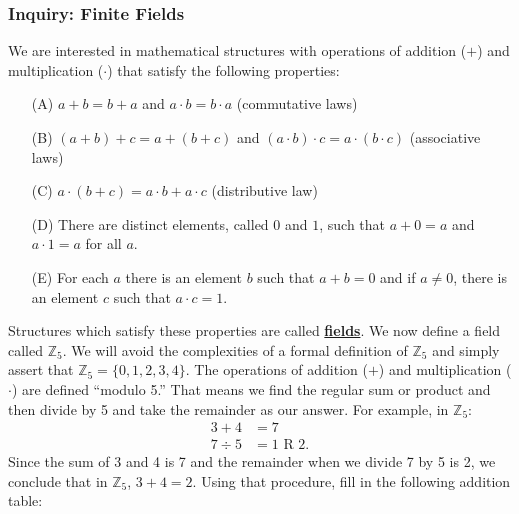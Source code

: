 \documentclass[11pt]{article}
\newenvironment{task}
	{\begin{mdframed}[linecolor=lightgray, linewidth=3pt]\raggedright}
	{\end{mdframed}}
\renewcommand\emph[1]{\underline{\bf{#1}}} %
\theoremstyle{definition}
\begin{document}
\subsubsection{Inquiry: Finite Fields}
\begin{task}
  We are interested in mathematical structures with operations of addition ($+$) and multiplication ($\cdot$) that satisfy the following properties:
  \begin{itemize}
    \item[(A)] $a+b=b+a$ and $a\cdot b=b\cdot a$ (commutative laws)
    \item[(B)] $(a+b)+c = a + (b+c)$ and $(a\cdot b)\cdot c = a\cdot (b \cdot c)$ (associative laws)
    \item[(C)] $a\cdot (b+c) = a\cdot b + a \cdot c$ (distributive law)
    \item[(D)] There are distinct elements, called $0$ and $1$, such that $a+0 = a $ and $a \cdot 1 = a$ for all $a$.
    \item[(E)] For each $a$ there is an element $b$ such that $a + b = 0$ and if $a\neq 0$, there is an element $c$ such that $a\cdot c = 1$.
  \end{itemize}
  Structures which satisfy these properties are called \emph{fields}. We now define a field called $\mathbb{Z}_5$. We will avoid the complexities of a formal definition of $\mathbb{Z}_5$ and simply assert that 
  $\mathbb{Z}_5 = \{ 0, 1, 2, 3, 4\}$. The operations of addition ($+$) and multiplication ($\cdot$) are defined ``modulo 5.'' That means we find
  the regular sum or product and then divide by 5 and take the remainder as our answer. For example, in $\mathbb{Z}_5$:
  \begin{align*}
    3 + 4 &= 7\\
    7 \div 5 &= 1 \text{ R } 2.
  \end{align*}
  Since the sum of 3 and 4 is 7 and the remainder when we divide 7 by 5 is 2, we conclude that in $\mathbb{Z}_5$, $3 + 4 = 2$. Using that procedure, fill in
  the following addition table:


\end{task}
\end{document}

